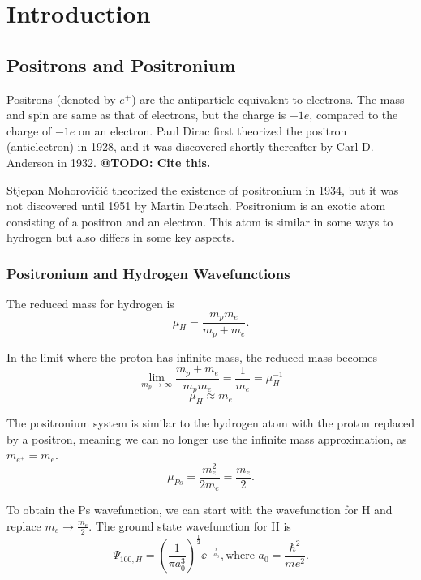\documentclass[Introduction.tex]{subfiles}
\begin{document}
\chapter{Introduction}
\label{sec:Introduction}


\section{Positrons and Positronium}
Positrons (denoted by $e^+$) are the antiparticle equivalent to electrons.  The mass and spin are same as that of electrons, but the charge is $+1e$, compared to the charge of $-1e$ on an electron.  Paul Dirac first theorized the positron (antielectron) in 1928, and it was discovered shortly thereafter by Carl D. Anderson in 1932. \textbf{@TODO: Cite this.}

Stjepan Mohorovi\u{c}i\'{c} theorized the existence of positronium in 1934, but it was not discovered until 1951 by Martin Deutsch.  Positronium is an exotic atom consisting of a positron and an electron.  This atom is similar in some ways to hydrogen but also differs in some key aspects.  

\subsection{Positronium and Hydrogen Wavefunctions}
The reduced mass for hydrogen is
\begin{equation}
\mu_H = \frac{m_p m_e}{m_p + m_e}.
\end{equation}

In the limit where the proton has infinite mass, the reduced mass becomes
\begin{equation}
\lim_{m_p \to \infty} \frac{m_p + m_e}{m_p m_e} = \frac{1}{m_e} = \mu_H^{-1}
\end{equation}
\begin{equation}
\mu_H \approx m_e
\end{equation}

The positronium system is similar to the hydrogen atom with the proton replaced by a positron, meaning we can no longer use the infinite mass approximation, as $m_{e^+} = m_e$.
\begin{equation}
\mu_{Ps} = \frac{m_e^2}{2 m_e} = \frac{m_e}{2}.
\end{equation}

To obtain the Ps wavefunction, we can start with the wavefunction for H and replace $m_e \rightarrow \frac{m_e}{2}$.  The ground state wavefunction for H is
\begin{equation}
\Psi_{100,H} = \left(\frac{1}{\pi a_0^3}\right)^{\frac{1}{2}} \!\! \ee^{-\frac{r}{a_0}},
\text{where } a_0 = \frac{\hbar^2}{m e^2}.
\end{equation}
\end{document}
